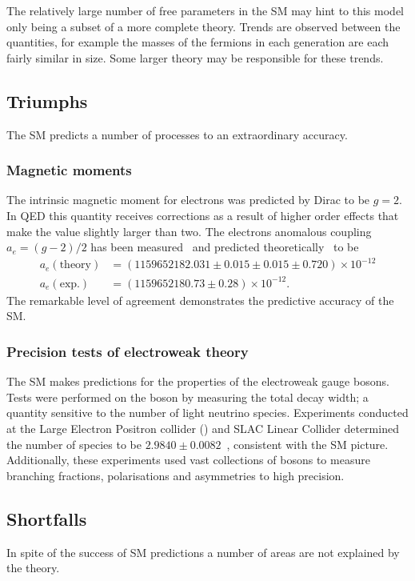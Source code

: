 The relatively large number of free parameters in the SM may hint to this model only being a subset of a more complete theory. Trends are observed between the quantities, for example the masses of the fermions in each generation are each fairly similar in size. Some larger theory may be responsible for these trends.  

\subsection{Triumphs}
The SM predicts a number of processes to an extraordinary accuracy. 
\subsubsection{Magnetic moments}
The intrinsic magnetic moment for electrons was predicted by Dirac to be $g=2$. In QED this quantity receives corrections as a result of higher order effects that make the value slightly larger than two. The electrons anomalous coupling $a_{e} = (g-2)/2$ has been measured~\cite{PhysRevLett.100.120801} and predicted theoretically~\cite{PhysRevD.96.019901} to be 
\begin{equation}
\begin{split}
a_e(\text{theory}) & = (1159652182.031\pm0.015\pm0.015\pm0.720)\times10^{-12}\\
a_e(\text{exp.})   & = (1159652180.73\pm0.28)\times10^{-12}.
\end{split}
\end{equation}
The remarkable level of agreement demonstrates the predictive accuracy of the SM. 



\subsubsection{Precision tests of electroweak theory}

The SM makes predictions for the properties of the electroweak gauge bosons. Tests were performed on the \Z boson by measuring the total decay width; a quantity sensitive to the number of light neutrino species. Experiments conducted at the Large Electron Positron collider (\lep) and SLAC Linear Collider determined the number of species to be $2.9840\pm0.0082$~\cite{ALEPH:2005ab}, consistent with the SM picture.
Additionally, these experiments used vast collections of \Z bosons to measure branching fractions, polarisations and asymmetries to high precision.  

\subsection{Shortfalls}
In spite of the success of SM predictions a number of areas are not explained by the theory.  

